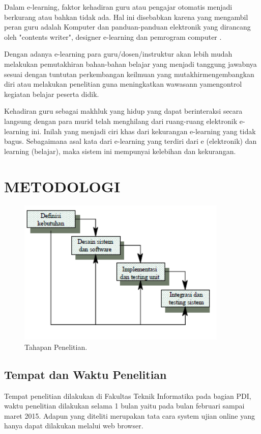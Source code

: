 \documentclass{jtetiproposalskripsi}
\begin{document}
Dalam e-learning, faktor kehadiran guru atau pengajar otomatis menjadi berkurang atau bahkan tidak ada. Hal ini disebabkan karena yang mengambil peran guru adalah Komputer dan panduan-panduan elektronik yang dirancang oleh "contents writer", designer e-learning dan pemrogram computer .

Dengan adanya e-learning para guru/dosen/instruktur akan lebih mudah melakukan pemutakhiran bahan-bahan belajar yang menjadi tanggung jawabnya sesuai dengan tuntutan perkembangan keilmuan yang mutakhirmengembangkan diri atau melakukan penelitian guna meningkatkan wawasann yamengontrol kegiatan belajar peserta didik.

Kehadiran guru sebagai makhluk yang hidup yang dapat berinteraksi secara langsung dengan para murid telah menghilang dari ruang-ruang elektronik e-learning ini. Inilah yang menjadi ciri khas dari kekurangan e-learning yang tidak bagus. Sebagaimana asal kata dari e-learning yang terdiri dari e (elektronik) dan learning (belajar), maka sistem ini mempunyai kelebihan dan kekurangan.


\chapter{METODOLOGI}

\begin{figure}[ht!]
  \centering
    \includegraphics[width=10cm]{gambar/tahappenelitian}
    \caption{Tahapan Penelitian.}
    \label{openwrt}
\end{figure}

\section{Tempat dan Waktu Penelitian}
Tempat penelitian  dilakukan di Fakultas Teknik Informatika pada bagian PDI, waktu penelitian dilakukan selama 1 bulan yaitu pada bulan februari sampai maret 2015. Adapun yang diteliti merupakan tata cara system ujian online yang hanya dapat dilakukan melalui web browser.
\end{document}
